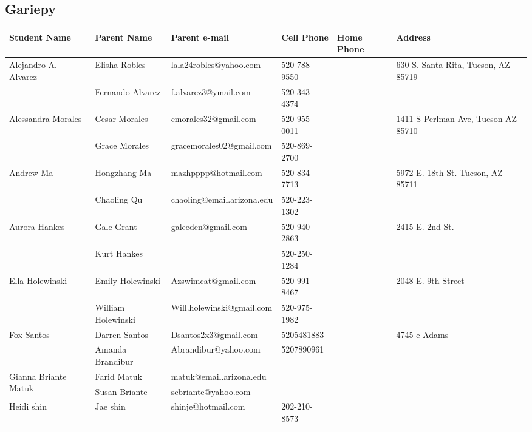 \documentclass[landscape]{article}\usepackage[]{graphicx}\usepackage[]{color}
\begin{document}
\subsection{Gariepy}
\begin{longtable}{|p{100pt}|p{100pt}|p{140pt}|p{60pt}|p{64pt}|p{120pt}|}
\textbf{Student Name} & \textbf{Parent Name} & \textbf{Parent e-mail} & \textbf{Cell Phone} & \textbf{Home Phone} & \textbf{Address}\\
\hline
\hline
\multirow{2}{100pt}{Alejandro A. Alvarez} & Elisha Robles & lala24robles@yahoo.com & 520-788-9550 &  & \multirow{2}{120pt}{630 S. Santa Rita, Tucson, AZ 85719} \\
 & Fernando Alvarez & f.alvarez3@ymail.com & 520-343-4374 &  & \\
\hline
\multirow{2}{100pt}{Alessandra Morales} & Cesar Morales  & cmorales32@gmail.com & 520-955-0011 &  & \multirow{2}{120pt}{1411 S Perlman Ave, Tucson AZ 85710} \\
 & Grace Morales & gracemorales02@gmail.com & 520-869-2700 &  & \\
\hline
\multirow{2}{100pt}{Andrew Ma} & Hongzhang Ma & mazhpppp@hotmail.com & 520-834-7713 &  & \multirow{2}{120pt}{5972 E. 18th St. Tucson, AZ 85711} \\
 & Chaoling Qu & chaoling@email.arizona.edu & 520-223-1302 &  & \\
\hline
\multirow{2}{100pt}{Aurora Hankes} & Gale Grant & galeeden@gmail.com & 520-940-2863 &  & \multirow{2}{120pt}{2415 E. 2nd St.} \\
 & Kurt Hankes &  & 520-250-1284 &  & \\
\hline
\multirow{2}{100pt}{Ella Holewinski} & Emily Holewinski & Azswimcat@gmail.com & 520-991-8467 &  & \multirow{2}{120pt}{2048 E. 9th Street} \\
 & William Holewinski & Will.holewinski@gmail.com & 520-975-1982 &  & \\
\hline
\multirow{2}{100pt}{Fox Santos} & Darren Santos & Dsantos2x3@gmail.com & 5205481883 &  & \multirow{2}{120pt}{4745 e Adams} \\
 & Amanda Brandibur & Abrandibur@yahoo.com & 5207890961 &  & \\
\hline
\multirow{2}{100pt}{Gianna Briante Matuk} & Farid Matuk & matuk@email.arizona.edu &  &  & \multirow{2}{120pt}{} \\
 & Susan Briante & scbriante@yahoo.com &  &  & \\
\hline
\multirow{2}{100pt}{Heidi shin} & Jae shin & shinje@hotmail.com & 202-210-8573 &  & \multirow{2}{120pt}{} \\

\end{longtable}
\end{document}
